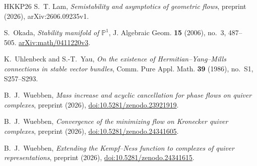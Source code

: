 \begin{thebibliography}{HKKP26}
S.~T. Lam, \emph{Semistability and asymptotics of geometric flows}, preprint
(2026), arXiv:2606.09235v1.

S.~Okada,
\textit{Stability manifold of $\mathbb P^1$},
J. Algebraic Geom. \textbf{15} (2006), no.~3, 487--505.
\href{https://arxiv.org/abs/math/0411220v3}{arXiv:\allowbreak math/\allowbreak 0411220v3}.

K.~Uhlenbeck and S.-T.~Yau,
\textit{On the existence of Hermitian--Yang--Mills connections in stable
vector bundles},
Comm. Pure Appl. Math. \textbf{39} (1986), no.~S1, S257--S293.

B.~J.~Wuebben,
\textit{Mass increase and acyclic cancellation for phase flows on quiver
complexes},
preprint (2026),
\href{https://doi.org/10.5281/zenodo.23921919}{doi:10.5281/zenodo.23921919}.

B.~J.~Wuebben,
\textit{Convergence of the minimizing flow on Kronecker quiver complexes},
preprint (2026), \href{https://doi.org/10.5281/zenodo.24341605}{doi:10.5281/zenodo.24341605}.

B.~J.~Wuebben,
\textit{Extending the Kempf--Ness function to complexes of quiver
representations},
preprint (2026), \href{https://doi.org/10.5281/zenodo.24341615}{doi:10.5281/zenodo.24341615}.

\end{thebibliography}
